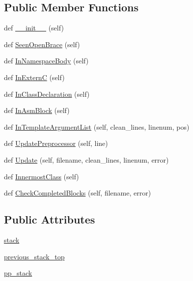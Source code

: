 \subsection*{Public Member Functions}
\begin{DoxyCompactItemize}
\item 
def \hyperlink{classcpplint_1_1NestingState_a47e1ad559b9c7304f53d19ef6ebedab4}{\+\_\+\+\_\+init\+\_\+\+\_\+} (self)
\item 
def \hyperlink{classcpplint_1_1NestingState_a15abc0719a22ca8fbb7a8235f0e22b3e}{Seen\+Open\+Brace} (self)
\item 
def \hyperlink{classcpplint_1_1NestingState_a1a06f50d53cfe11b1f78d45b531e0c32}{In\+Namespace\+Body} (self)
\item 
def \hyperlink{classcpplint_1_1NestingState_a67aa1907d42b8408c227ff18537071c7}{In\+ExternC} (self)
\item 
def \hyperlink{classcpplint_1_1NestingState_a8e111c25149c41bd8927606244965b3c}{In\+Class\+Declaration} (self)
\item 
def \hyperlink{classcpplint_1_1NestingState_aa35a529052e4863a477eae649ce778d2}{In\+Asm\+Block} (self)
\item 
def \hyperlink{classcpplint_1_1NestingState_a8f4e9ba1aaa0459de2bedd966e7a2b54}{In\+Template\+Argument\+List} (self, clean\+\_\+lines, linenum, pos)
\item 
def \hyperlink{classcpplint_1_1NestingState_ac3d509c536af445e8ab6b17b067b53f1}{Update\+Preprocessor} (self, line)
\item 
def \hyperlink{classcpplint_1_1NestingState_a3adead8c1575b98ace5c5230f3772c1e}{Update} (self, filename, clean\+\_\+lines, linenum, error)
\item 
def \hyperlink{classcpplint_1_1NestingState_a4141768e75b16698463670caaa587120}{Innermost\+Class} (self)
\item 
def \hyperlink{classcpplint_1_1NestingState_a7bde5ab65152b4073763b1bd17cba567}{Check\+Completed\+Blocks} (self, filename, error)
\end{DoxyCompactItemize}
\subsection*{Public Attributes}
\begin{DoxyCompactItemize}
\item 
\hyperlink{classcpplint_1_1NestingState_a6ae9bea040f988d152922788d0d73a15}{stack}
\item 
\hyperlink{classcpplint_1_1NestingState_a7aa34c8fb8df73d76f702c7012c46911}{previous\+\_\+stack\+\_\+top}
\item 
\hyperlink{classcpplint_1_1NestingState_a3a5ca37e3066d91830ea1faa8feae4e5}{pp\+\_\+stack}
\end{DoxyCompactItemize}


